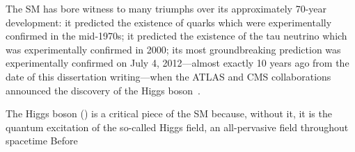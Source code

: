 The SM has bore witness to many triumphs over its approximately 70-year development:
it predicted the existence of quarks which were experimentally confirmed in the mid-1970s;
it predicted the existence of the tau neutrino which was experimentally confirmed in 2000;
its most groundbreaking prediction was experimentally confirmed on July 4, 2012---almost exactly 10 years ago from the date of this dissertation writing---when the ATLAS and CMS collaborations announced the discovery of the Higgs boson~\cite{Chatrchyan:2012xdj}.


% 
The Higgs boson (\PH) is a critical piece of the SM because, without it,  it is the quantum excitation of the so-called Higgs field, an all-pervasive field throughout spacetime 
Before 

